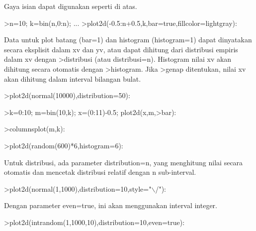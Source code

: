\documentclass{article}
\begin{document}
\begin{eulernotebook}
\begin{eulercomment}
\begin{eulercomment}
\begin{eulercomment}
\begin{eulercomment}
\begin{eulercomment}
Gaya isian dapat digunakan seperti di atas.
\end{eulercomment}
\begin{eulerprompt}
>n=10; k=bin(n,0:n); ...
>plot2d(-0.5:n+0.5,k,bar=true,fillcolor=lightgray):
\end{eulerprompt}
\begin{eulercomment}
Data untuk plot batang (bar=1) dan histogram (histogram=1) dapat
dinyatakan secara eksplisit dalam xv dan yv, atau dapat dihitung dari
distribusi empiris dalam xv dengan \textgreater{}distribusi (atau distribusi=n).
Histogram nilai xv akan dihitung secara otomatis dengan \textgreater{}histogram.
Jika \textgreater{}genap ditentukan, nilai xv akan dihitung dalam interval bilangan
bulat.
\end{eulercomment}
\begin{eulerprompt}
>plot2d(normal(10000),distribution=50):
\end{eulerprompt}
\begin{eulerprompt}
>k=0:10; m=bin(10,k); x=(0:11)-0.5; plot2d(x,m,>bar):
\end{eulerprompt}
\begin{eulerprompt}
>columnsplot(m,k):
\end{eulerprompt}
\begin{eulerprompt}
>plot2d(random(600)*6,histogram=6):
\end{eulerprompt}
\begin{eulercomment}
Untuk distribusi, ada parameter distribution=n, yang menghitung nilai
secara otomatis dan mencetak distribusi relatif dengan n sub-interval.
\end{eulercomment}
\begin{eulerprompt}
>plot2d(normal(1,1000),distribution=10,style="\(\backslash\)/"):
\end{eulerprompt}
\begin{eulercomment}
Dengan parameter even=true, ini akan menggunakan interval integer.
\end{eulercomment}
\begin{eulerprompt}
>plot2d(intrandom(1,1000,10),distribution=10,even=true):
\end{eulerprompt}

\end{eulercomment}
\end{eulercomment}
\end{eulercomment}
\end{eulercomment}
\end{eulernotebook}
\end{document}

